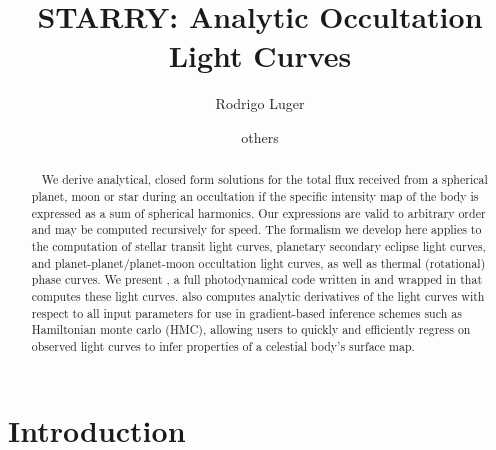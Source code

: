 \documentclass[modern]{aastex61}
\begin{document}

\setlength{\abovedisplayskip}{1.5em}
\setlength{\belowdisplayskip}{1.5em}

\title{%
    \textbf{STARRY}: Analytic Occultation Light Curves
}

\author[0000-0002-0296-3826]{Rodrigo Luger}
\author{others}


\begin{abstract}
    We derive analytical, closed form solutions for the total flux
    received from a spherical planet, moon or star during an occultation
    if the specific intensity map of the body is expressed as a
    sum of spherical harmonics. Our expressions are valid to arbitrary order
    and may be computed recursively for speed. The formalism we develop
    here applies to the computation of stellar transit light curves,
    planetary secondary eclipse light curves, and planet-planet/planet-moon
    occultation light curves, as well as thermal (rotational) phase curves.
    We present \starry, a full photodynamical code written in \C
    and wrapped in \Python that computes these light curves. \starry also
    computes analytic derivatives of the light curves with respect to all input
    parameters for use in gradient-based inference schemes such as
    Hamiltonian monte carlo (HMC), allowing users to quickly and efficiently
    regress on observed light curves to infer properties of a celestial body's
    surface map.
\end{abstract}

%


%
\section{Introduction}
\label{sec:intro}
\end{document}
